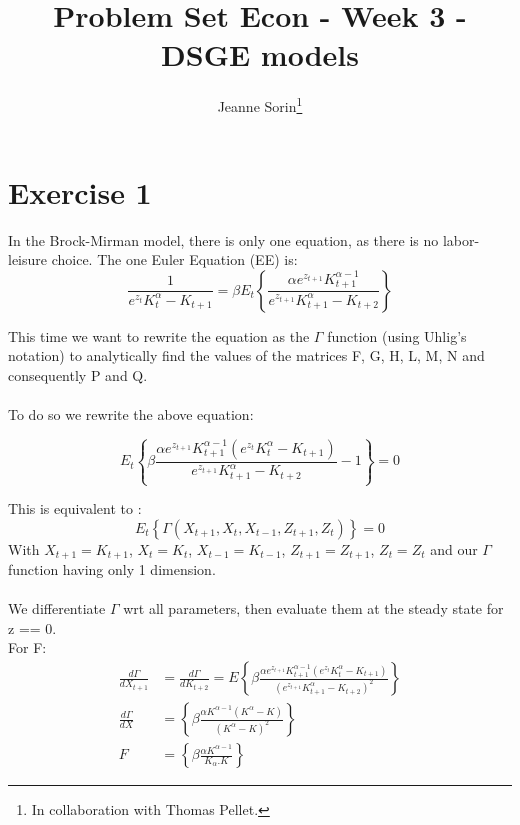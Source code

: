 \documentclass[11pt]{article}
\title{Problem Set Econ - Week 3 - DSGE models}
\author{Jeanne Sorin\footnote{In collaboration with Thomas Pellet.}}
\numberwithin{equation}{section}
\theoremstyle{plain}
\theoremstyle{definition}
\newcommand{\1}{\mathbbm 1}
\def\a{\alpha}
\def\b{\beta}
\begin{document}
\maketitle



\section*{Exercise 1}
In the Brock-Mirman model, there is only one equation, as there is no labor-leisure choice. The one Euler Equation (EE) is:
\begin{equation}
\frac{1}{e^{z_{t}} K_{t}^{\alpha}-K_{t+1}}=\beta E_{t}\left\{\frac{\alpha e^{z_{t+1}} K_{t+1}^{\alpha-1}}{e^{z_{t+1}} K_{t+1}^{\alpha}-K_{t+2}}\right\}
\end{equation}

This time we want to rewrite the equation as the $\Gamma$ function (using Uhlig's notation) to analytically find the values of the matrices F, G, H, L, M, N and consequently P and Q.
\\
\\
To do so we rewrite the above equation:

\begin{equation}
	E_t \left\{\b \frac{ \a e^{z_{t+1}} K_{t+1}^{\a - 1} (e^{z_t} K_t ^\a -K_{t+1})}{e^{z_{t+1}}K_{t+1}^{\a} - K_{t+2}} -1 \right\}= 0
\end{equation}

This is equivalent to :
\begin{equation}
	E_t \left\{\Gamma (X_{t+1}, X_t, X_{t-1}, Z_{t+1}, Z_t) \right\} = 0
\end{equation}
With $X_{t+1} = K_{t+1}$, $X_{t} = K_{t}$, $X_{t-1} = K_{t-1}$, $Z_{t+1} = Z_{t+1}$, $Z_{t} = Z_{t}$ and our $\Gamma$ function having only 1 dimension.
\\
\\
We differentiate $\Gamma$ wrt all parameters, then evaluate them at the steady state for z == 0. \\
For F:
\begin{align}
	\frac{d\Gamma}{d X_{t+1}} &= \frac{d\Gamma}{d K_{t+2}} = E \left\{\b \frac{\a e^{z_{t+1}} K_{t+1}^{\a - 1} (e^{z_t} K_t ^\a -K_{t+1})}{(e^{z_{t+1}}K_{t+1}^{\a} - K_{t+2})^2}
	\right\} \\
	\frac{d\Gamma}{d X} &= \left\{\b \frac{\a K^{\a - 1} (K ^\a -K)}{(K^{\a} - K)^2}
	\right\} \\
	F &=  \left\{\b \frac{\a K^{\a - 1}}{K_\a. K} \right\}
\end{align}
\end{document}
